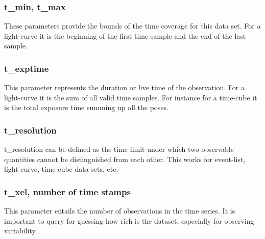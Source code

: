 \documentclass[11pt,a4paper]{ivoa}
\begin{document}
 \subsubsection{t\_min, t\_max}
 These parameters provide the bounds of the time coverage for this data set. For a light-curve it is the beginning of the first time sample and the end of the last sample.
  \subsubsection{t\_exptime}
  This parameter represents the duration or live time of the observation. 
  For a light-curve it is the sum of all valid time samples. For instance for a time-cube it is the total exposure time summing up all the poses.
  \subsubsection{t\_resolution}
  t\_resolution can be defined as the time limit under which two observable quantities cannot be distinguished from each other.
  This works for event-list, light-curve, time-cube data sets, etc. 
  \subsubsection{t\_xel, number of time stamps}
This parameter entails the number of observations in the time series. It is important to query for guessing how rich is the dataset, especially for observing variability .


\end{document}
